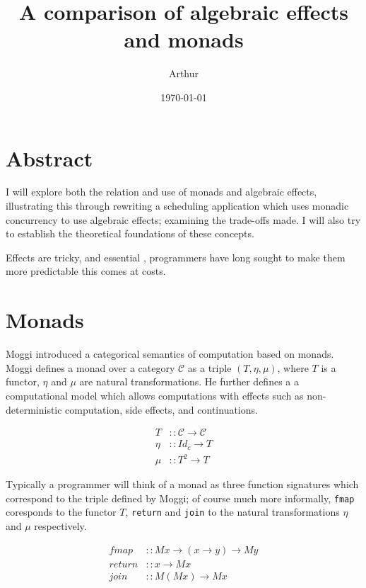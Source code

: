 \documentclass[a4paper,10pt]{article}
\title{A comparison of algebraic effects and monads}
\author{Arthur}
\date{\today}
\theoremstyle{definition}
\begin{document}
\maketitle
\section{Abstract}

I will explore both the relation and use of monads and algebraic effects,
illustrating this through rewriting a scheduling application which uses
monadic concurrency to use algebraic effects; examining the trade-offs made.
I will also try to establish the theoretical foundations of these concepts.

Effects are tricky, and essential , programmers have long sought to make them more predictable
this comes at costs.

\section{Monads}

Moggi \cite{moggi1989computational} introduced a categorical semantics of computation
based on monads. Moggi defines a monad over a category $\mathcal{C}$ as a triple $(T,\eta,\mu)$,
where $T$ is a functor, $\eta$ and $\mu$ are natural transformations. He further defines a
a computational model which allows computations with effects such as non-deterministic 
computation, side effects, and continuations.

\begin{equation}
  \begin{split}
    T    &:: \mathcal{C} \rightarrow \mathcal{C} \\
    \eta &:: Id_c \rightarrow T                  \\
    \mu  &:: T^2 \rightarrow T
  \end{split}
\end{equation}

Typically a programmer will think of a monad as three function signatures
which correspond to the triple defined by Moggi; of course much more
informally, \texttt{fmap} coresponds to the functor $T$, \texttt{return} and \texttt{join} to the
natural transformations $\eta$ and $\mu$ respectively.

\begin{equation}
  \begin{split}
    fmap   &:: M x \rightarrow (x \rightarrow y) \rightarrow M y \\
    return &:: x \rightarrow M x                                 \\
    join   &:: M (M x) \rightarrow M x
  \end{split}
\end{equation}
\end{document}
